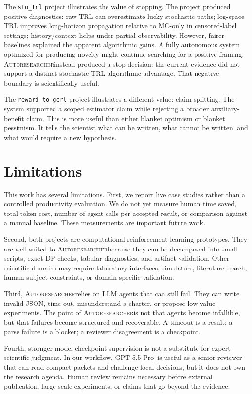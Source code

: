 \documentclass{article}
\newcommand{\sys}{\textsc{Autoresearcher}}
\newcommand{\gptpro}{GPT-5.5-Pro}
\begin{document}
The \texttt{sto\_trl} project illustrates the value of stopping. The project produced positive diagnostics: raw TRL can overestimate lucky stochastic paths; log-space TRL improves long-horizon propagation relative to MC-only in censored-label settings; history/context helps under partial observability. However, fairer baselines explained the apparent algorithmic gains. A fully autonomous system optimized for producing novelty might continue searching for a positive framing. \sys instead produced a stop decision: the current evidence did not support a distinct stochastic-TRL algorithmic advantage. That negative boundary is scientifically useful.

The \texttt{reward\_to\_gcrl} project illustrates a different value: claim splitting. The system supported a scoped estimator claim while rejecting a broader auxiliary-benefit claim. This is more useful than either blanket optimism or blanket pessimism. It tells the scientist what can be written, what cannot be written, and what would require a new hypothesis.

\section{Limitations}

This work has several limitations. First, we report live case studies rather than a controlled productivity evaluation. We do not yet measure human time saved, total token cost, number of agent calls per accepted result, or comparison against a manual baseline. These measurements are important future work.

Second, both projects are computational reinforcement-learning prototypes. They are well suited to \sys because they can be decomposed into small scripts, exact-DP checks, tabular diagnostics, and artifact validation. Other scientific domains may require laboratory interfaces, simulators, literature search, human-subject constraints, or domain-specific validation.

Third, \sys relies on LLM agents that can still fail. They can write invalid JSON, time out, misunderstand a charter, or propose low-value experiments. The point of \sys is not that agents become infallible, but that failures become structured and recoverable. A timeout is a result; a parse failure is a blocker; a reviewer disagreement is a checkpoint.

Fourth, stronger-model checkpoint supervision is not a substitute for expert scientific judgment. In our workflow, \gptpro\ is useful as a senior reviewer that can read compact packets and challenge local decisions, but it does not own the research agenda. Human review remains necessary before external publication, large-scale experiments, or claims that go beyond the evidence.
\end{document}
